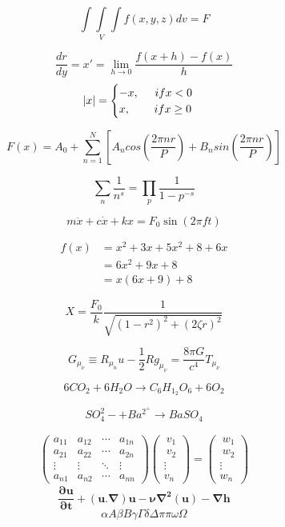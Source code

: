 \documentclass{article}
\begin{document}
\clearpage
\[\int\int\limits_V\int f(x,y,z)dv = F\]

\[\frac{dr}{dy}=x'=\lim_{h\rightarrow 0}\frac{f(x+h)-f(x)}{h}\]
$$|x|=
\begin{cases}
    -x,\hspace{0.5cm}if x<0\\
    x,\hspace{0.75cm} if x\geq 0
\end{cases}$$


\[F(x)=A_0+\sum_{n=1}^{N}\left[A_n cos \left(\frac{2\pi nr}{P}\right)+B_n sin\left(\frac{2\pi nr}{P}\right) \right]\]

\[ \sum_{n} \frac{1}{n^s} = \prod_p \frac{1}{1 - p^{-s}} \]

\[m\ddot{x}+c\dot{x}+kx=F_{0}\sin(2\pi ft)\]

\begin{equation}
\begin{split}
f(x)& =x^2+3x+5x^2+8+6x\\ 
    &= 6x^2+9x+8\\
    &=x(6x+9)+8
\end{split}
\end{equation}

\[X=\frac{F_0}{k} \frac{1}{\sqrt{(1-r^2)^2+(2\zeta r)^2}}\]

\[G_\mu_\nu\equiv R_\mu_nu - \frac{1}{2}Rg_\mu_\nu=\frac{8\pi G}{c^4}T_\mu_\nu\]

\[6CO_2 + 6H_2O \rightarrow C_6H_1_2O_6 + 6O_2\]

\[SO_4^2- + Ba^2^+ \rightarrow BaSO_4\]

\begin{gather*}
\begin{pmatrix}
    a_{11} & a_{12} & \cdots & a_{1n} \\ 
    a_{21} & a_{22} & \cdots & a_{2n} \\    
    \vdots & \vdots & \ddots & \vdots \\    
    a_{n1} & a_{n2} & \cdots & a_{nn} 
\end{pmatrix}\begin{pmatrix}
    \ v_{1} \\[0.3em]
    \ v_{2} \\[0.3em]
    \vdots \\[0.3em]
    v_{n}
\end{pmatrix} = \begin{pmatrix}
    \ w_{1} \\[0.38em]
    \ w_{2} \\[0.3em]
    \vdots \\[0.3em]
w_{n}    
\end{pmatrix}
\end{gather*}
\[\mathbf{\frac{\partial u}{\partial t}+ (u.\nabla) u-\nu\nabla^2(u)-\nabla h }\]
\[\alpha A \beta B\gamma \Gamma\delta \Delta\pi \pi \omega \Omega\]
\end{document}
